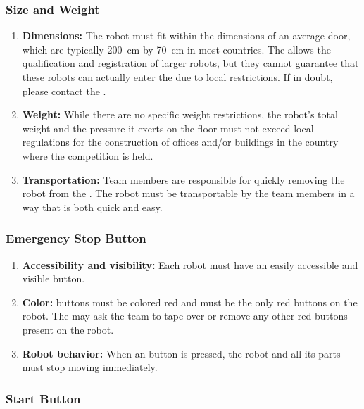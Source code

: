 \subsubsection{Size and Weight}\label{rule:robots_size}

\begin{enumerate}
	\item \textbf{Dimensions:} The robot must fit within the dimensions of an average door, which are typically \SI{200}{\centi\meter} by \SI{70}{\centi\meter} in most countries.
	The \TC{} allows the qualification and registration of larger robots, but they cannot guarantee that these robots can actually enter the \Arena{} due to local restrictions.
	If in doubt, please contact the \LOC{}.
	\item \textbf{Weight:} While there are no specific weight restrictions, the robot's total weight and the pressure it exerts on the floor must not exceed local regulations for the construction of offices and/or buildings in the country where the competition is held.
	\item \textbf{Transportation:} Team members are responsible for quickly removing the robot from the \Arena{}.
	The robot must be transportable by the team members in a way that is both quick and easy.
\end{enumerate}

\subsubsection{Emergency Stop Button}\label{rule:robots_emergency_button}

\begin{enumerate}
	\item \textbf{Accessibility and visibility:} Each robot must have an easily accessible and visible \EmergencyStop{} button.
	\item \textbf{Color:} \EmergencyStop{} buttons must be colored red and must be the only red buttons on the robot.
	The \TC{} may ask the team to tape over or remove any other red buttons present on the robot.
	\item \textbf{Robot behavior:} When an \EmergencyStop{} button is pressed, the robot and all its parts must stop moving immediately.
\end{enumerate}

\subsubsection{Start Button}\label{rule:start_button}

